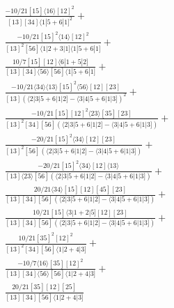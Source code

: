 \documentclass[varwidth, border=5pt]{standalone}
\begin{document}
\begin{my}
$\begin{gathered}
\scriptscriptstyle\frac{-10/21[15]⟨16⟩[12]^2}{[13][34]⟨1|5+6|1]^2}+\\
\scriptscriptstyle\frac{-10/21[15]^2⟨14⟩[12]^2}{[13]^2[56]⟨1|2+3|1]⟨1|5+6|1]}+\\
\scriptscriptstyle\frac{10/7[15][12]⟨6|1+5|2]}{[13][34]⟨56⟩[56]⟨1|5+6|1]}+\\
\scriptscriptstyle\frac{-10/21⟨34⟩⟨13⟩[15]^2⟨56⟩[12][23]}{[13](⟨2|3|5+6|1|2]-⟨3|4|5+6|1|3])^2}+\\
\scriptscriptstyle\frac{-10/21[15][12]^2⟨23⟩[35][23]}{[13]^2[34][56](⟨2|3|5+6|1|2]-⟨3|4|5+6|1|3])}+\\
\scriptscriptstyle\frac{-20/21[15]^2⟨34⟩[12][23]}{[13]^2[56](⟨2|3|5+6|1|2]-⟨3|4|5+6|1|3])}+\\
\scriptscriptstyle\frac{-20/21[15]^2⟨34⟩[12]⟨13⟩}{[13]⟨23⟩[56](⟨2|3|5+6|1|2]-⟨3|4|5+6|1|3])}+\\
\scriptscriptstyle\frac{20/21⟨34⟩[15][12][45][23]}{[13][34][56](⟨2|3|5+6|1|2]-⟨3|4|5+6|1|3])}+\\
\scriptscriptstyle\frac{10/21[15]⟨3|1+2|5][12][23]}{[13][34][56](⟨2|3|5+6|1|2]-⟨3|4|5+6|1|3])}+\\
\scriptscriptstyle\frac{10/21[35]^2[12]^2}{[13]^2[34][56]⟨1|2+4|3]}+\\
\scriptscriptstyle\frac{-10/7⟨16⟩[35][12]^2}{[13][34]⟨56⟩[56]⟨1|2+4|3]}+\\
\scriptscriptstyle\frac{20/21[35][12][25]}{[13][34][56]⟨1|2+4|3]}\phantom{+}
\end{gathered}$
\end{my}
\end{document}
